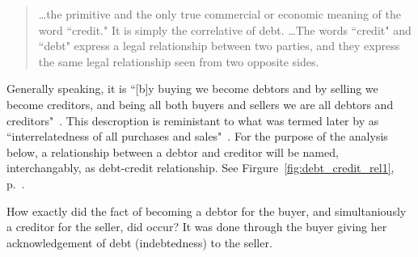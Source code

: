 \begin{quote}\dots the primitive and the only true commercial or economic meaning of the word ``credit." It is simply the correlative of debt. \dots The words ``credit" and ``debt"
 express a legal relationship between two parties, and they express the
 same legal relationship seen from two opposite sides. \citep[p.~392]{innes1913}
\end{quote}

Generally speaking, it is ``[b]y buying we become debtors and by selling we become creditors, and being all both buyers and sellers we are all debtors and creditors"~\citep[p.~393]{innes1913}. This descroption is reministant to what was termed later by \citeauthor{ayres1944} as ``interrelatedness of all purchases and sales"~\citep[p.~35]{ayres1944}. For the purpose of the analysis below, a relationship between a debtor and creditor will be named, interchangably, as debt-credit relationship. See Firgure~\ref{fig:debt_credit_rel1}, p.~\pageref{fig:debt_credit_rel1}.

How exactly did the fact of becoming a debtor for the buyer, and simultaniously a creditor for the seller, did occur? It was done through the buyer giving her acknowledgement of debt (indebtedness) to the seller. 

